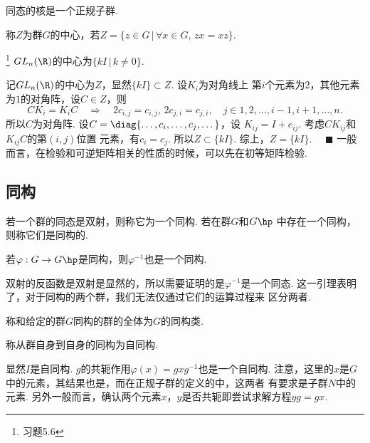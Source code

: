   \begin{thm}
    同态的核是一个正规子群.
  \end{thm}

  \begin{defi}[中心]
    称$Z$为群$G$的中心，若$Z=\{z\in G\,|\, \forall x\in G,\,zx=xz\}$.
  \end{defi}

  \begin{pos}
    \footnote{习题5.6}
    $GL_n(\R)$的中心为$\{kI\,|\,k\ne 0\}$.
  \end{pos}
  \proof
    记$GL_n(\R)$的中心为$Z$，显然$\{kI\}\subset Z$. 设$K_i$为对角线上
    第$i$个元素为$2$，其他元素为$1$的对角阵，设$C\in Z$，则
    \[
      CK_i = K_iC \quad\Rightarrow\quad
      2c_{i, j} = c_{i, j},\,2c_{j, i} = c_{j, i},
      \quad j\in{1,2,\dots,i-1,i+1,\dots,n}.
    \]
    所以$C$为对角阵. 设$C=\diag{\dots,c_i,\dots,c_j,\dots}$，设
    $K_{ij} = I+e_{ij}$. 考虑$CK_{ij}$和$K_{ij}C$的第$(i,j)$位置
    元素，有$c_i=c_j$. 所以$Z\subset\{kI\}$. 综上，$Z=\{kI\}$.
    $\quad\blacksquare$
  \remark
    一般而言，在检验和可逆矩阵相关的性质的时候，可以先在初等矩阵检验.

\subsection{同构}

  \begin{defi}
    若一个群的同态是双射，则称它为一个同构. 若在群$G$和$G\hp$
    中存在一个同构，则称它们是同构的.
  \end{defi}

  \begin{lemma}
    若$\varphi:G\to G\hp$是同构，则$\varphi^{-1}$也是一个同构.
  \end{lemma}
  \proof
    双射的反函数是双射是显然的，所以需要证明的是$\varphi^{-1}$是一个同态.
  \remark
    这一引理表明了，对于同构的两个群，我们无法仅通过它们的运算过程来
    区分两者.

  \begin{defi}[同构类]
    称和给定的群$G$同构的群的全体为$G$的同构类.
  \end{defi}

  \begin{defi}
    称从群自身到自身的同构为自同构.
  \end{defi}
  \remark
    显然$I$是自同构. $g$的共轭作用$\varphi(x)=gxg^{-1}$也是一个自同构.
    注意，这里的$x$是$G$中的元素，其结果也是，而在正规子群的定义的中，这两者
    有要求是子群$N$中的元素.
    另外一般而言，确认两个元素$x$，$y$是否共轭即尝试求解方程$yg=gx$.


